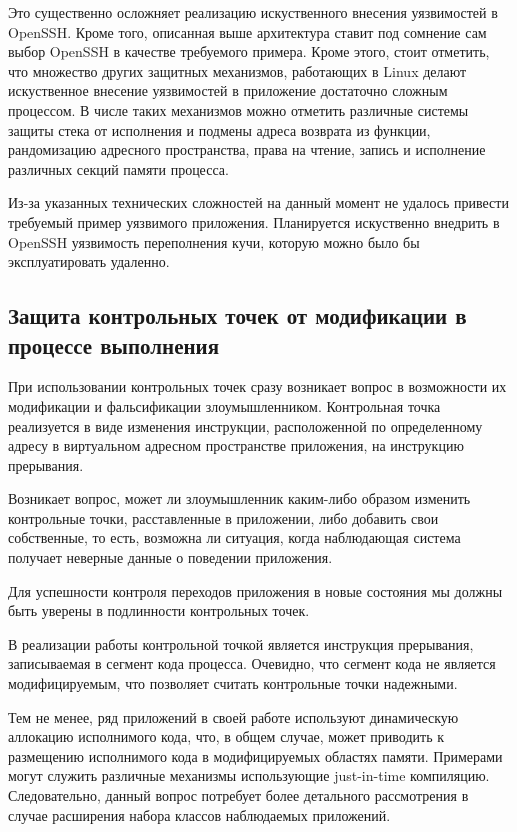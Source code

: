 Это существенно осложняет реализацию искуственного внесения 
уязвимостей в OpenSSH. Кроме того, описанная выше архитектура
ставит под сомнение сам выбор OpenSSH в качестве требуемого 
примера. Кроме этого, стоит отметить, что множество других 
защитных механизмов, работающих в Linux делают искуственное 
внесение уязвимостей в приложение достаточно сложным процессом. 
В числе таких механизмов можно отметить различные системы защиты 
стека от исполнения и подмены адреса возврата из функции, 
рандомизацию адресного пространства, права на чтение, запись и 
исполнение различных секций памяти процесса. 

Из-за указанных технических сложностей на данный момент не удалось 
привести требуемый пример уязвимого приложения. Планируется 
искуственно внедрить в OpenSSH уязвимость переполнения кучи, 
которую можно было бы эксплуатировать удаленно.

\subsection{Защита контрольных точек от модификации в процессе 
		выполнения}
\bigskip

При использовании контрольных точек сразу возникает вопрос 
в возможности их модификации и фальсификации злоумышленником.
Контрольная точка реализуется в виде изменения инструкции, 
расположенной по определенному адресу в виртуальном адресном 
пространстве приложения, на инструкцию прерывания.

Возникает вопрос, может ли злоумышленник каким-либо образом 
изменить контрольные точки, расставленные в приложении, 
либо добавить свои собственные, то есть, возможна ли 
ситуация, когда наблюдающая система получает неверные 
данные о поведении приложения. 

Для успешности контроля переходов приложения в новые состояния
мы должны быть уверены в подлинности контрольных точек. 

В реализации работы контрольной точкой является инструкция 
прерывания, записываемая в сегмент кода процесса. Очевидно, что 
сегмент кода не является модифицируемым, что позволяет считать 
контрольные точки надежными. 

Тем не менее, ряд приложений в своей работе используют 
динамическую аллокацию исполнимого кода, что, в общем случае, 
может приводить к размещению исполнимого кода в модифицируемых
областях памяти. Примерами могут служить различные механизмы
использующие just-in-time компиляцию. Следовательно, данный 
вопрос потребует более детального рассмотрения в случае 
расширения набора классов наблюдаемых приложений.

